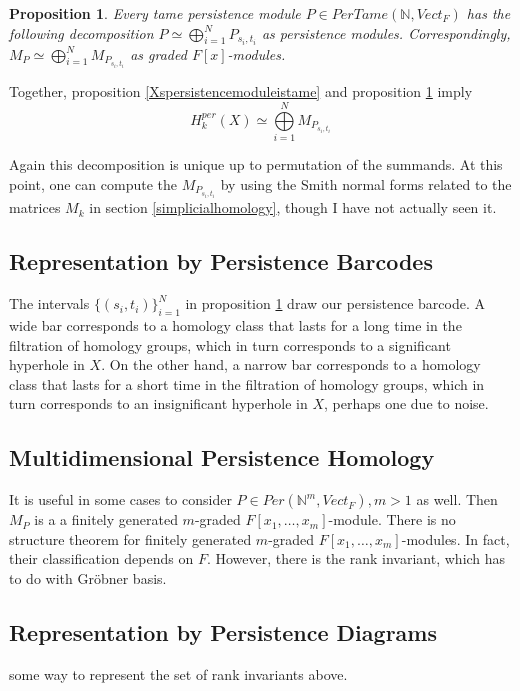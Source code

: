 \documentclass[12pt]{amsart}
\newtheorem{proposition}[theorem]{Proposition}
\theoremstyle{definition}
\begin{document}
\begin{proposition}\label{tamedecomposesintoinvervals} Every tame persistence module $P \in PerTame(\mathbb{N}, Vect_F)$ has the following decomposition $P \simeq \bigoplus \limits_{i = 1}^N P_{s_i, t_i}$ as persistence modules. Correspondingly, $M_P \simeq \bigoplus \limits_{i = 1}^N M_{P_{s_i, t_i}}$ as graded $F[x]$-modules.
\end{proposition}

Together, proposition \ref{Xspersistencemoduleistame} and proposition \ref{tamedecomposesintoinvervals} imply
$$H_k^{per}(X) \simeq \bigoplus \limits_{i = 1}^N M_{P_{s_i, t_i}}$$

Again this decomposition is unique up to permutation of the summands. At this point, one can compute the $M_{P_{s_i, t_i}}$ by using the Smith normal forms related to the matrices $M_k$ in section \ref{simplicialhomology}, though I have not actually seen it. 

\subsection{Representation by Persistence Barcodes} The intervals $\{(s_i, t_i)\}_{i = 1}^N$ in proposition \ref{tamedecomposesintoinvervals} draw our persistence barcode. A wide bar corresponds to a homology class that lasts for a long time in the filtration of homology groups, which in turn corresponds to a significant hyperhole in $X$. On the other hand, a narrow bar corresponds to a homology class that lasts for a short time in the filtration of homology groups, which in turn corresponds to an insignificant hyperhole in $X$, perhaps one due to noise.

\subsection{Multidimensional Persistence Homology} It is useful in some cases to consider $P \in Per(\mathbb{N}^m, Vect_F), m > 1$ as well. Then $M_P$ is a a finitely generated $m$-graded $F[x_1, \dots , x_m]$-module. There is no structure theorem for finitely generated $m$-graded $F[x_1, \dots , x_m]$-modules. In fact, their classification depends on $F$. However, there is the rank invariant, which has to do with Gr\"{o}bner basis.

\subsection{Representation by Persistence Diagrams} some way to represent the set of rank invariants above.
\end{document}
